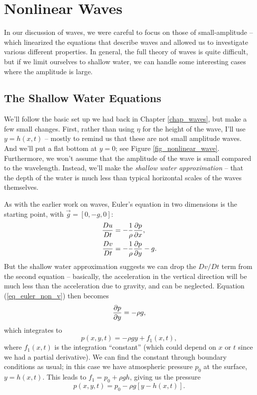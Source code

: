 %
% 

\section{Nonlinear Waves}

In our discussion of waves, we were careful to focus on those of small-amplitude -- which linearized the equations that describe waves and allowed us to investigate various different properties.  In general, the full theory of waves is quite difficult, but if we limit ourselves to shallow water, we can handle some interesting cases where the amplitude is large.

\subsection{The Shallow Water Equations}

We'll follow the basic set up we had back in Chapter \ref{chap_waves}, but make a few small changes.  First, rather than using $\eta$ for the height of the wave, I'll use $y = h(x, t)$ -- mostly to remind us that these are not small amplitude waves.  And we'll put a flat bottom at $y = 0$; see Figure \ref{fig_nonlinear_wave}.  Furthermore, we won't assume that the amplitude of the wave is small compared to the wavelength.  Instead, we'll make the \emph{shallow water approximation} -- that the depth of the water is much less than typical horizontal scales of the waves themselves.


As with the earlier work on waves, Euler's equation in two dimensions is the starting point, with $\vec{g} = [0, -g, 0]$:
\begin{align}
\frac{Du}{Dt} & = -\frac{1}{\rho} \frac{\partial {p}}{\partial {x}}, \label{eq_euler_non_u}\\
\frac{Dv}{Dt} & = - \frac{1}{\rho} \frac{\partial {p}}{\partial {y}} - g. \label{eq_euler_non_v}
\end{align}
But the shallow water approximation suggests we can drop the $Dv/Dt$ term from the second equation -- basically, the acceleration in the vertical direction will be much less than the acceleration due to gravity, and can be neglected.  Equation (\ref{eq_euler_non_v}) then becomes
\[
\frac{\partial {p}}{\partial {y}} = -\rho g,
\]
which integrates to
\[
p(x, y, t) = -\rho g y + f_1(x, t),
\]
where $f_1(x, t)$ is the integration ``constant'' (which could depend on $x$ or $t$ since we had a partial derivative).  We can find the constant through boundary conditions as usual; in this case we have atmospheric pressure $p_0$ at the surface, $y = h(x, t)$.  This leads to $f_1 = p_0 + \rho g h$, giving us the pressure
\begin{equation}
p(x, y, t) = p_0 - \rho g [ y - h(x, t)].
\end{equation}

